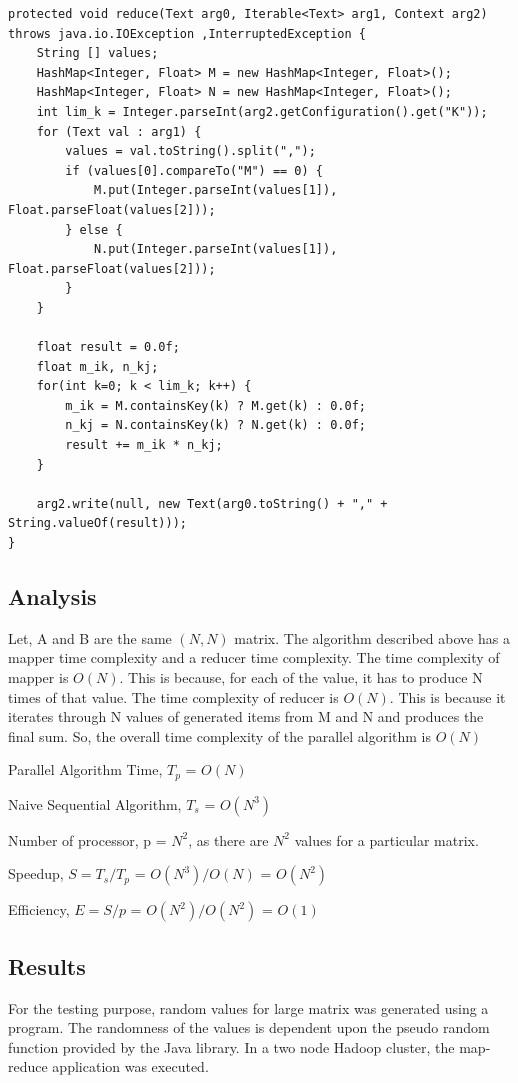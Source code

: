 \documentclass{article}
\begin{document}
\begin{lstlisting}[caption={Matrix multiplication reducer code snippet},label={lst:mmred},style=MyJavaStyle]
protected void reduce(Text arg0, Iterable<Text> arg1, Context arg2) throws java.io.IOException ,InterruptedException {
    String [] values;
    HashMap<Integer, Float> M = new HashMap<Integer, Float>();
    HashMap<Integer, Float> N = new HashMap<Integer, Float>();
    int lim_k = Integer.parseInt(arg2.getConfiguration().get("K"));
    for (Text val : arg1) {
        values = val.toString().split(",");
        if (values[0].compareTo("M") == 0) {
            M.put(Integer.parseInt(values[1]), Float.parseFloat(values[2]));
        } else {
            N.put(Integer.parseInt(values[1]), Float.parseFloat(values[2]));
        }
    }

    float result = 0.0f;
    float m_ik, n_kj;
    for(int k=0; k < lim_k; k++) {
        m_ik = M.containsKey(k) ? M.get(k) : 0.0f;
        n_kj = N.containsKey(k) ? N.get(k) : 0.0f;
        result += m_ik * n_kj;
    }

    arg2.write(null, new Text(arg0.toString() + "," + String.valueOf(result)));
}
\end{lstlisting}

\subsection{Analysis}
Let, A and B are the same $(N,N)$ matrix.
The algorithm described above has a mapper time complexity and a reducer time complexity.
The time complexity of mapper is ${O(N)}$. This is because, for each of the value, it has to produce N times of that value.
The time complexity of reducer is ${O(N)}$. This is because it iterates through N values of generated items from M and N and produces the final sum.
So, the overall time complexity of the parallel algorithm is ${O(N)}$\BlankLine

Parallel Algorithm Time, ${T_{p}}$ = ${O(N)}$

Naive Sequential Algorithm, ${T_{s}}$ = ${O(N^3)}$

Number of processor, p = ${N^2}$, as there are ${N^2}$ values for a particular matrix.

Speedup, ${S = T_{s}/T_{p}}$ = ${O(N^3)/O(N)}$ = ${O(N^2)}$

Efficiency, ${E = S/p}$ = ${O(N^2) / O(N^2)}$ = ${O(1)}$

\subsection{Results}
For the testing purpose, random values for large matrix was generated using a program. The randomness of the values is dependent upon the pseudo random function provided by the Java library. In a two node Hadoop cluster, the map-reduce application was executed.\BlankLine
\end{document}
